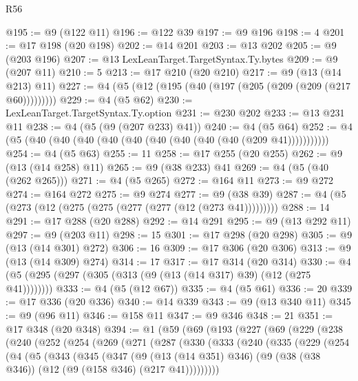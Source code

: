 \begin{lexlean}{R56}
\begin{coremodule}
@195 := @9 (@122 @11)
@196 := @122 @39
@197 := @9 @196
@198 := 4
@201 := @17 @198 (@20 @198)
@202 := @14 @201
@203 := @13 @202
@205 := @9 (@203 @196)
@207 := @13 LexLeanTarget.TargetSyntax.Ty.bytes
@209 := @9 (@207 @11)
@210 := 5
@213 := @17 @210 (@20 @210)
@217 := @9 (@13 (@14 @213) @11)
@227 := @4 (@5 (@12 (@195 (@40 (@197 (@205 (@209 (@209 (@217 @60)))))))))
@229 := @4 (@5 @62)
@230 := LexLeanTarget.TargetSyntax.Ty.option
@231 := @230 @202
@233 := @13 @231 @11
@238 := @4 (@5 (@9 (@207 @233) @41))
@240 := @4 (@5 @64)
@252 := @4 (@5 (@40 (@40 (@40 (@40 (@40 (@40 (@40 (@40 (@40 (@209 @41)))))))))))
@254 := @4 (@5 @63)
@255 := 11
@258 := @17 @255 (@20 @255)
@262 := @9 (@13 (@14 @258) @11)
@265 := @9 (@38 @233) @41
@269 := @4 (@5 (@40 (@262 @265)))
@271 := @4 (@5 @265)
@272 := @164 @11
@273 := @9 @272
@274 := @164 @272
@275 := @9 @274
@277 := @9 (@38 @39)
@287 := @4 (@5 (@273 (@12 (@275 (@275 (@277 (@277 (@12 (@273 @41)))))))))
@288 := 14
@291 := @17 @288 (@20 @288)
@292 := @14 @291
@295 := @9 (@13 @292 @11)
@297 := @9 (@203 @11)
@298 := 15
@301 := @17 @298 (@20 @298)
@305 := @9 (@13 (@14 @301) @272)
@306 := 16
@309 := @17 @306 (@20 @306)
@313 := @9 (@13 (@14 @309) @274)
@314 := 17
@317 := @17 @314 (@20 @314)
@330 := @4 (@5 (@295 (@297 (@305 (@313 (@9 (@13 (@14 @317) @39) (@12 (@275 @41))))))))
@333 := @4 (@5 (@12 @67))
@335 := @4 (@5 @61)
@336 := 20
@339 := @17 @336 (@20 @336)
@340 := @14 @339
@343 := @9 (@13 @340 @11)
@345 := @9 (@96 @11)
@346 := @158 @11
@347 := @9 @346
@348 := 21
@351 := @17 @348 (@20 @348)
@394 := @1
    (@59
      (@69
        (@193
          (@227
            (@69
              (@229
                (@238
                  (@240
                    (@252
                      (@254
                        (@269
                          (@271
                            (@287
                              (@330
                                (@333
                                  (@240
                                    (@335
                                      (@229
                                        (@254
                                          (@4
                                            (@5
                                              (@343
                                                (@345
                                                  (@347
                                                    (@9
                                                      (@13 (@14 @351) @346)
                                                      (@9
                                                        (@38 (@38 @346))
                                                        (@12 (@9 (@158 @346) (@217 @41)))))))))

\end{coremodule}
\end{lexlean}
